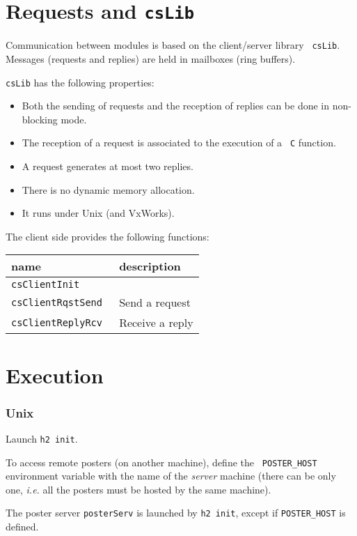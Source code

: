 \section{Requests and {\tt csLib}}

Communication between modules is based  on the client/server library {\tt
csLib}. Messages   (requests and replies)  are   held in mailboxes  (ring
buffers).

{\tt csLib} has the following properties:
\begin{itemize}
\item Both the sending of requests and the reception of replies can be
done in non-blocking mode.
\item The reception of a request is associated to the execution of a {\tt
C} function.
\item A request generates at most two replies.
\item There is no dynamic memory allocation.
\item It runs under Unix (and VxWorks).
\end{itemize}

The client side provides the following functions:

\begin{center}\small\begin{tabularx}{\linewidth}{|l|X|}
\hline
name		& description \\
\hline
\tt csClientInit 	& \\
\tt csClientRqstSend 	& Send a request\\
\tt csClientReplyRcv 	& Receive a reply\\
\hline
\end{tabularx}\end{center}


\section{Execution}

\subsubsection{Unix} Launch {\tt h2 init}.

To  access   remote posters   (on  another  machine),  define    the {\tt
POSTER\_HOST} environment  variable  with the  name  of the {\em  server}
machine (there can be only one, {\em i.e.} all the posters must be hosted
by the same machine).

The  poster server {\tt posterServ} is  launched by {\tt h2 init}, except
if {\tt POSTER\_HOST} is defined.

